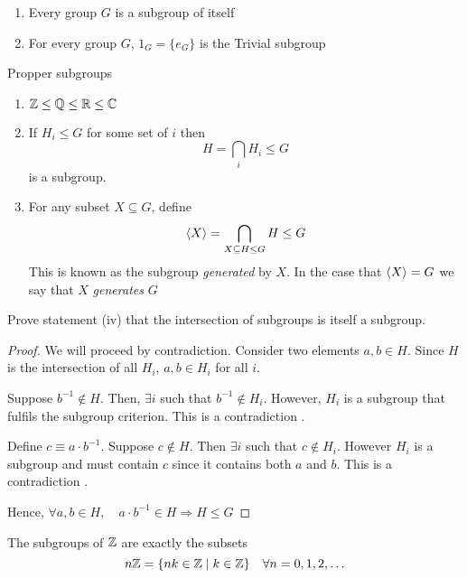 \documentclass{article}
\begin{document}
\begin{eg}\leavevmode
    \begin{enumerate}
        \item Every group $G$ is a subgroup of itself
        \item For every group $G$, $1_G = \{e_G\}$ is the Trivial subgroup
    \end{enumerate}
    Propper subgroups
    \begin{enumerate}[resume]
        \item $\mathbb{Z} \leq \mathbb{Q} \leq \mathbb{R} \leq \mathbb{C}$
        \item If $H_i \leq G$ for some set of $i$ then
        \[
            H = \bigcap_{i}{H_i} \leq G   
        \]
        is a subgroup.
        \item For any subset $X \subseteq G$, define
        \[
            \left\langle X\right\rangle = \bigcap_{X \subseteq H \leq G}{H} \leq G
        \]
        This is known as the subgroup \emph{generated} by $X$. In the case that $\left\langle X\right\rangle = G$ we say that $X$ \emph{generates} $G$
    \end{enumerate}
\end{eg}

\begin{ex}
    Prove statement (iv) that the intersection of subgroups is itself a subgroup. 
\end{ex}

\begin{proof}
    We will proceed by contradiction. Consider two elements $a, b \in H$. Since $H$ is the intersection of all $H_i$, $a, b \in H_i $ for all $i$.
    
    Suppose $b^{-1} \notin H$. Then, $\exists i$ such that $b^{-1} \notin H_i$. However, $H_i$ is a subgroup that fulfils the subgroup criterion. This is a contradiction \contradiction.

    Define $c \equiv a \cdot b^{-1}$. Suppose $c \notin H$. Then $\exists i$ such that $c \notin H_i$. However $H_i$ is a subgroup and must contain $c$ since it contains both $a$ and $b$. This is a contradiction \contradiction.
    
    Hence, $\forall a,b \in H, \quad a \cdot b^{-1} \in H \Rightarrow H \leq G$
\end{proof}

\begin{prop}
    The subgroups of $\mathbb{Z}$ are exactly the subsets
    \[
        n\mathbb{Z} = \{nk \in \mathbb{Z} \mid k \in \mathbb{Z}\} \quad \forall n = 0, 1, 2, \ldots
    \]
\end{prop}
\end{document}
